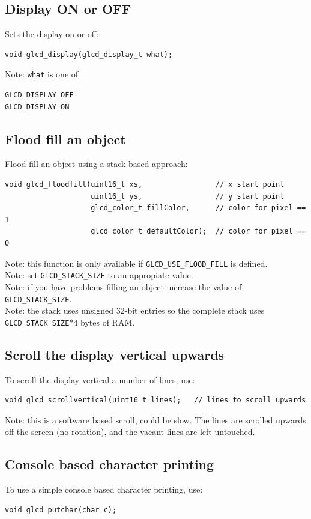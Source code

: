 \documentclass[12pt]{article}
\begin{document}
\subsection{Display ON or OFF}
Sets the display on or off:
\begin{lstlisting}
void glcd_display(glcd_display_t what);
\end{lstlisting}

Note: \lstinline|what| is one of

\begin{lstlisting}
GLCD_DISPLAY_OFF
GLCD_DISPLAY_ON
\end{lstlisting}

\subsection{Flood fill an object}
Flood fill an object using a stack based approach:
\begin{lstlisting}
void glcd_floodfill(uint16_t xs,                 // x start point
                    uint16_t ys,                 // y start point
                    glcd_color_t fillColor,      // color for pixel == 1
                    glcd_color_t defaultColor);  // color for pixel == 0
\end{lstlisting}

Note: this function is only available if \lstinline|GLCD_USE_FLOOD_FILL| is defined.\\
Note: set \lstinline|GLCD_STACK_SIZE| to an appropiate value.\\
Note: if you have problems filling an object increase the value of \lstinline|GLCD_STACK_SIZE|.\\
Note: the stack uses unsigned 32-bit entries so the complete stack uses \lstinline|GLCD_STACK_SIZE|*4 bytes of RAM.

\subsection{Scroll the display vertical upwards}
To scroll the display vertical a number of lines, use:
\begin{lstlisting}
void glcd_scrollvertical(uint16_t lines);   // lines to scroll upwards
\end{lstlisting}

Note: this is a software based scroll, could be slow. The lines are scrolled upwards off the screen (no rotation), and the vacant lines are left untouched.

\subsection{Console based character printing}
\label{sec:consolebasedcharacterprinting}
To use a simple console based character printing, use:
\begin{lstlisting}
void glcd_putchar(char c);
\end{lstlisting}
\end{document}
